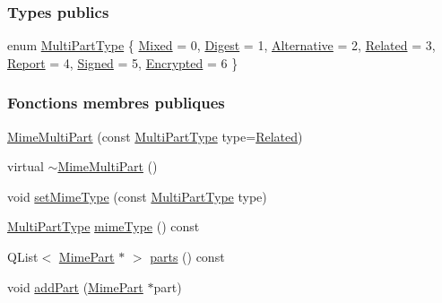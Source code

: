 \subsubsection*{Types publics}
\begin{DoxyCompactItemize}
\item 
enum \hyperlink{class_simple_mail_1_1_mime_multi_part_a6bef6836f893f87c64c4ff0cb9a93e53}{Multi\+Part\+Type} \{ \newline
\hyperlink{class_simple_mail_1_1_mime_multi_part_a6bef6836f893f87c64c4ff0cb9a93e53ab222359e53f39cf379544a498098c9ed}{Mixed} = 0, 
\hyperlink{class_simple_mail_1_1_mime_multi_part_a6bef6836f893f87c64c4ff0cb9a93e53a29a123559a0337abff6df81426bd7010}{Digest} = 1, 
\hyperlink{class_simple_mail_1_1_mime_multi_part_a6bef6836f893f87c64c4ff0cb9a93e53aec0d8426d60b6adf0e4dc74499d03888}{Alternative} = 2, 
\hyperlink{class_simple_mail_1_1_mime_multi_part_a6bef6836f893f87c64c4ff0cb9a93e53a853ea48b60c6dbcee4197ca06e66d921}{Related} = 3, 
\newline
\hyperlink{class_simple_mail_1_1_mime_multi_part_a6bef6836f893f87c64c4ff0cb9a93e53a462320423a5a00b2524a7505676a2938}{Report} = 4, 
\hyperlink{class_simple_mail_1_1_mime_multi_part_a6bef6836f893f87c64c4ff0cb9a93e53a1298ebd7effc2b17014c05ae098f3c7a}{Signed} = 5, 
\hyperlink{class_simple_mail_1_1_mime_multi_part_a6bef6836f893f87c64c4ff0cb9a93e53a6153be31709ab87dca074cc4b3b1addc}{Encrypted} = 6
 \}
\end{DoxyCompactItemize}
\subsubsection*{Fonctions membres publiques}
\begin{DoxyCompactItemize}
\item 
\hyperlink{class_simple_mail_1_1_mime_multi_part_ab739aa2f5357ecacb56b0ef3fa0aa2eb}{Mime\+Multi\+Part} (const \hyperlink{class_simple_mail_1_1_mime_multi_part_a6bef6836f893f87c64c4ff0cb9a93e53}{Multi\+Part\+Type} type=\hyperlink{class_simple_mail_1_1_mime_multi_part_a6bef6836f893f87c64c4ff0cb9a93e53a853ea48b60c6dbcee4197ca06e66d921}{Related})
\item 
virtual \hyperlink{class_simple_mail_1_1_mime_multi_part_a460bb28faff5859d22cacd49defb3284}{$\sim$\+Mime\+Multi\+Part} ()
\item 
void \hyperlink{class_simple_mail_1_1_mime_multi_part_a4828f209e87597da86778a98f4466744}{set\+Mime\+Type} (const \hyperlink{class_simple_mail_1_1_mime_multi_part_a6bef6836f893f87c64c4ff0cb9a93e53}{Multi\+Part\+Type} type)
\item 
\hyperlink{class_simple_mail_1_1_mime_multi_part_a6bef6836f893f87c64c4ff0cb9a93e53}{Multi\+Part\+Type} \hyperlink{class_simple_mail_1_1_mime_multi_part_a4893232a5d10553a8c7200da60132c9e}{mime\+Type} () const
\item 
Q\+List$<$ \hyperlink{class_simple_mail_1_1_mime_part}{Mime\+Part} $\ast$ $>$ \hyperlink{class_simple_mail_1_1_mime_multi_part_afdfbaaa95c2cd5aa38c0078f1e6e6a38}{parts} () const
\item 
void \hyperlink{class_simple_mail_1_1_mime_multi_part_a11b7d5bc0ac8610d113f781fb6f8b52b}{add\+Part} (\hyperlink{class_simple_mail_1_1_mime_part}{Mime\+Part} $\ast$part)
\end{DoxyCompactItemize}
